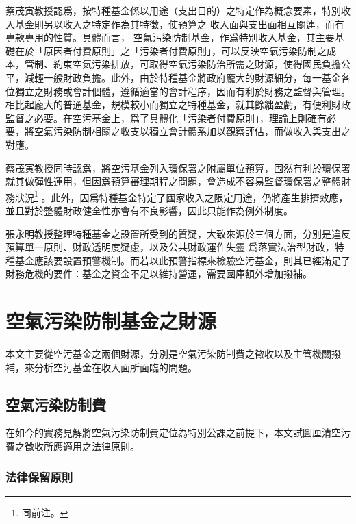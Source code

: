 \documentclass[12pt,a4paper]{article}
\begin{document}
蔡茂寅教授認爲，按特種基金係以用途（支出目的）之特定作為概念要素，特別收入基金則另以收入之特定作為其特徵，使預算之 收入面與支出面相互關連，而有專款專用的性質。具體而言，
空氣污染防制基金，作爲特別收入基金，其主要基礎在於「原因者付費原則」之「污染者付費原則」，可以反映空氣污染防制之成本，管制、約束空氣污染排放，可取得空氣污染防治所需之財源，使得國民負擔公平，減輕一般財政負擔。此外，由於特種基金將政府龐大的財源細分，每一基金各位獨立之財務或會計個體，遵循適當的會計程序，因而有利於財務之監督與管理。相比起龐大的普通基金，規模較小而獨立之特種基金，就其餘絀盈虧，有便利財政監督之必要。在空污基金上，爲了具體化「污染者付費原則」，理論上則確有必要，將空氣污染防制相關之收支以獨立會計體系加以觀察評估，而做收入與支出之對應。

蔡茂寅教授同時認爲，將空污基金列入環保署之附屬單位預算，固然有利於環保署就其做彈性運用，但因爲預算審理期程之問題，會造成不容易監督環保署之整體財務狀況\footnote{同前注。}
。此外，因爲特種基金特定了國家收入之限定用途，仍將產生排擠效應，並且對於整體財政健全性亦會有不良影響，因此只能作為例外制度。


張永明教授整理特種基金之設置所受到的質疑，大致來源於三個方面，分別是違反預算單一原則、財政透明度疑慮，以及公共財政運作失靈
爲落實法治型財政，特種基金應該要設置預警機制。而若以此預警指標來檢驗空污基金，則其已經滿足了財務危機的要件：基金之資金不足以維持營運，需要國庫額外增加撥補。


\pagebreak

\section{空氣污染防制基金之財源}

本文主要從空污基金之兩個財源，分別是空氣污染防制費之徵收以及主管機關撥補，來分析空污基金在收入面所面臨的問題。

\subsection{空氣污染防制費}

在如今的實務見解將空氣污染防制費定位為特別公課之前提下，本文試圖厘清空污費之徵收所應適用之法律原則。

\subsubsection{法律保留原則}
\end{document}
